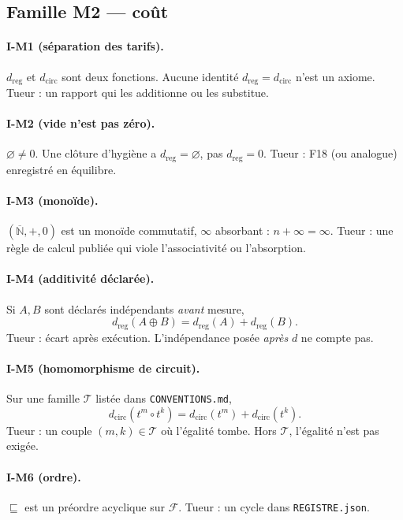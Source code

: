 \documentclass[11pt,a4paper]{article}
\newcommand{\Nbar}{\overline{\mathbb{N}}}
\theoremstyle{definition}
\begin{document}
\subsection{Famille M2 --- coût}

\paragraph{I-M1 (séparation des tarifs).}
$d_{\mathrm{reg}}$ et $d_{\mathrm{circ}}$ sont deux fonctions.
Aucune identité $d_{\mathrm{reg}}=d_{\mathrm{circ}}$ n'est un axiome.
Tueur : un rapport qui les additionne ou les substitue.

\paragraph{I-M2 (vide n'est pas zéro).}
$\varnothing\neq 0$.
Une clôture d'hygiène a $d_{\mathrm{reg}}=\varnothing$, pas $d_{\mathrm{reg}}=0$.
Tueur : F18 (ou analogue) enregistré en équilibre.

\paragraph{I-M3 (monoïde).}
$(\Nbar,+,0)$ est un monoïde commutatif, $\infty$ absorbant :
$n+\infty=\infty$.
Tueur : une règle de calcul publiée qui viole l'associativité ou l'absorption.

\paragraph{I-M4 (additivité déclarée).}
Si $A,B$ sont déclarés indépendants \emph{avant} mesure,
\[
d_{\mathrm{reg}}(A\oplus B)=d_{\mathrm{reg}}(A)+d_{\mathrm{reg}}(B).
\]
Tueur : écart après exécution. L'indépendance posée \emph{après} $d$ ne compte pas.

\paragraph{I-M5 (homomorphisme de circuit).}
Sur une famille $\mathcal{T}$ listée dans \texttt{CONVENTIONS.md},
\[
d_{\mathrm{circ}}(t^{m}\circ t^{k})=d_{\mathrm{circ}}(t^{m})+d_{\mathrm{circ}}(t^{k}).
\]
Tueur : un couple $(m,k)\in\mathcal{T}$ où l'égalité tombe.
Hors $\mathcal{T}$, l'égalité n'est pas exigée.

\paragraph{I-M6 (ordre).}
$\sqsubseteq$ est un préordre acyclique sur $\mathcal{F}$.
Tueur : un cycle dans \texttt{REGISTRE.json}.
\end{document}
